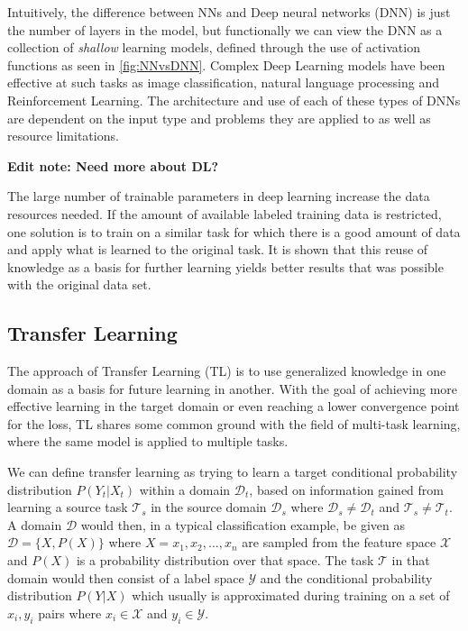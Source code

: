 Intuitively, the difference between NNs and Deep neural networks (DNN) is just the number of layers in the model, but functionally we can view the DNN as a collection of \textit{shallow} learning models, defined through the use of activation functions as seen in \ref{fig:NNvsDNN}. Complex Deep Learning models have been effective at such tasks as image classification\cite{imageclassification}, natural language processing\cite{deepnlp} and Reinforcement Learning\cite{deepreinforcementlearning}. The architecture and use of each of these types of DNNs are dependent on the input type and problems they are applied to as well as resource limitations.

\textbf{Edit note: Need more about DL?}

The large number of trainable parameters in deep learning increase the data resources needed. If the amount of available labeled training data is restricted, one solution is to train on a similar task for which there is a good amount of data and apply what is learned to the original task. It is shown that this reuse of knowledge as a basis for further learning yields better results that was possible with the original data set\cite{pathnet, progressiveneuralnetworks, tradaboost}. 

\subsection{Transfer Learning}
\label{background:TL}
The approach of Transfer Learning (TL) is to use generalized knowledge in one domain as a basis for future learning in another. With the goal of achieving more effective learning in the target domain or even reaching a lower convergence point for the loss, TL shares some common ground with the field of multi-task learning, where the same model is applied to multiple tasks. 

We can define transfer learning as trying to learn a target conditional probability distribution \(P(Y_{t}|X_{t})\) within a domain \(\mathcal{D}_{t}\), based on information gained from learning a source task \(\mathcal{T}_{s}\) in the source domain \(\mathcal{D}_{s}\) where \(\mathcal{D}_{s} \neq \mathcal{D}_{t}\) and \(\mathcal{T}_{s} \neq \mathcal{T}_{t}\). A domain \(\mathcal{D}\) would then, in a typical classification example, be given as \(\mathcal{D} = \{X, P(X)\}\) where \(X = x_{1},x_{2}, \dotsc ,x_{n}\) are sampled from the feature space \(\mathcal{X}\) and \(P(X)\) is a probability distribution over that space. The task \(\mathcal{T}\) in that domain would then consist of a label space \(\mathcal{Y}\) and the conditional probability distribution \(P(Y|X)\) which usually is approximated during training on a set of \(x_{i}, y_{i}\) pairs where \(x_{i} \in \mathcal{X}\) and \(y_{i} \in \mathcal{Y}\).
\newline\newline


